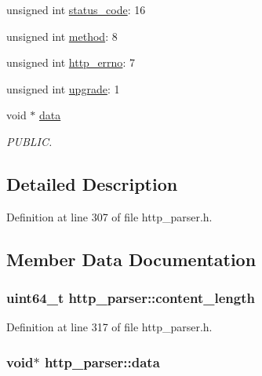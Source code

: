 \begin{DoxyCompactItemize}
\item 
unsigned int \hyperlink{structhttp__parser_a82f5aed92ca3566489def7bc384bab26}{status\-\_\-code}\-: 16
\item 
unsigned int \hyperlink{structhttp__parser_a7955de339fafd81ad54380845913457d}{method}\-: 8
\item 
unsigned int \hyperlink{structhttp__parser_ab8638d65fa174bc1925d77e2533117fa}{http\-\_\-errno}\-: 7
\item 
unsigned int \hyperlink{structhttp__parser_a748f476eacc5ac56b84dd07dbafb42a4}{upgrade}\-: 1
\item 
void $\ast$ \hyperlink{structhttp__parser_a7e87ce57b97f60f1fdb7039a8ecb0bca}{data}
\begin{DoxyCompactList}\small\item\em P\-U\-B\-L\-I\-C. \end{DoxyCompactList}\end{DoxyCompactItemize}


\subsection{Detailed Description}


Definition at line 307 of file http\-\_\-parser.\-h.



\subsection{Member Data Documentation}
\hypertarget{structhttp__parser_a7fd5a194802b1206bb773e096d291f29}{
\subsubsection[{content\-\_\-length}]{\setlength{\rightskip}{0pt plus 5cm}uint64\-\_\-t http\-\_\-parser\-::content\-\_\-length}}\label{structhttp__parser_a7fd5a194802b1206bb773e096d291f29}


Definition at line 317 of file http\-\_\-parser.\-h.

\hypertarget{structhttp__parser_a7e87ce57b97f60f1fdb7039a8ecb0bca}{
\subsubsection[{data}]{\setlength{\rightskip}{0pt plus 5cm}void$\ast$ http\-\_\-parser\-::data}}\label{structhttp__parser_a7e87ce57b97f60f1fdb7039a8ecb0bca}


